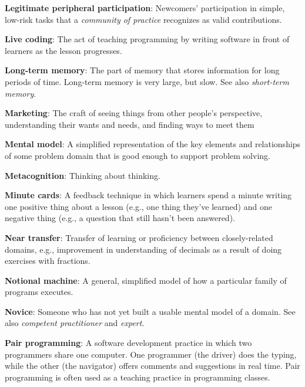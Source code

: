 \textbf{\hypertarget{g:legitimate-peripheral-participation}{Legitimate peripheral participation}\label{g:legitimate-peripheral-participation}}:
Newcomers' participation in simple, low-risk tasks that a \emph{community
of practice} recognizes as valid contributions.

\textbf{\hypertarget{g:live-coding}{Live coding}\label{g:live-coding}}: The act of teaching programming
by writing software in front of learners as the lesson progresses.

\textbf{\hypertarget{g:long-term-memory}{Long-term memory}\label{g:long-term-memory}}: The part of memory
that stores information for long periods of time. Long-term memory is
very large, but slow. See also \emph{short-term memory}.

\textbf{\hypertarget{g:marketing}{Marketing}\label{g:marketing}}: The craft of seeing things from
other people's perspective, understanding their wants and needs, and
finding ways to meet them

\textbf{\hypertarget{g:mental-model}{Mental model}\label{g:mental-model}}: A simplified representation
of the key elements and relationships of some problem domain that is
good enough to support problem solving.

\textbf{\hypertarget{g:metacognition}{Metacognition}\label{g:metacognition}}: Thinking about thinking.

\textbf{\hypertarget{g:minute-cards}{Minute cards}\label{g:minute-cards}}: A feedback technique in which
learners spend a minute writing one positive thing about a lesson (e.g.,
one thing they've learned) and one negative thing (e.g., a question that
still hasn't been answered).

\textbf{\hypertarget{g:near-transfer}{Near transfer}\label{g:near-transfer}}: Transfer of learning or
proficiency between closely-related domains, e.g., improvement in
understanding of decimals as a result of doing exercises with fractions.

\textbf{\hypertarget{g:notional-machine}{Notional machine}\label{g:notional-machine}}: A general, simplified
model of how a particular family of programs executes.

\textbf{\hypertarget{g:novice}{Novice}\label{g:novice}}: Someone who has not yet built a usable
mental model of a domain. See also \emph{competent practitioner} and
\emph{expert}.

\textbf{\hypertarget{g:pair-programming}{Pair programming}\label{g:pair-programming}}: A software
development practice in which two programmers share one computer. One
programmer (the driver) does the typing, while the other (the navigator)
offers comments and suggestions in real time. Pair programming is often
used as a teaching practice in programming classes.

